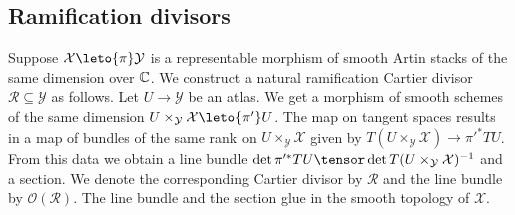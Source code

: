\subsection{Ramification divisors}\label{RamDiv}
Suppose $\mathcal{X}\leto{\pi} \mathcal{Y}$ is a representable morphism of smooth Artin stacks of the same dimension over $\Bbb{C}$. We construct a natural  ramification Cartier divisor $\mathcal{R}\subseteq \mathcal{Y}$ as follows. Let $U\to \mathcal{Y}$
be an atlas. We get a morphism of smooth schemes of the same dimension
$U\times_{\mathcal{Y}}\mathcal{X}\leto{\pi'} U$. The map on tangent spaces results in  a map of bundles of the same rank on $U\times_{\mathcal{Y}}\mathcal{X}$ given by $T (U\times_{\mathcal{Y}} \mathcal{X}) \to \pi'^* TU$. From this data we obtain  a line bundle $\det \pi'^* TU\tensor \det T (U\times_{\mathcal{Y}}\mathcal{X})^{-1}$ and a section. We denote the corresponding Cartier divisor by $\mathcal{R}$ and the line bundle by $\mathcal{O}(\mathcal{R})$. The line bundle and the section glue in the smooth topology of $\mathcal{X}$.



